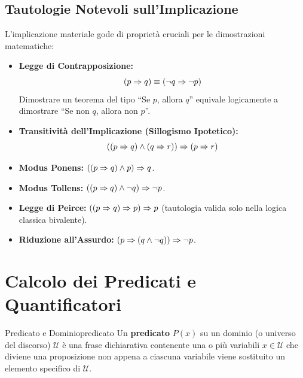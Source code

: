 \subsection{Tautologie Notevoli sull'Implicazione}
L'implicazione materiale gode di proprietà cruciali per le dimostrazioni matematiche:
\begin{itemize}
    \item \textbf{Legge di Contrapposizione:}
    \[
        (p \Rightarrow q) \equiv (\neg q \Rightarrow \neg p)
    \]
    Dimostrare un teorema del tipo ``Se $p$, allora $q$'' equivale logicamente a dimostrare ``Se non $q$, allora non $p$''.
    \item \textbf{Transitività dell'Implicazione (Sillogismo Ipotetico):}
    \[
        ((p \Rightarrow q) \wedge (q \Rightarrow r)) \Rightarrow (p \Rightarrow r)
    \]
    \item \textbf{Modus Ponens:} $((p \Rightarrow q) \wedge p) \Rightarrow q$.
    \item \textbf{Modus Tollens:} $((p \Rightarrow q) \wedge \neg q) \Rightarrow \neg p$.
    \item \textbf{Legge di Peirce:} $((p \Rightarrow q) \Rightarrow p) \Rightarrow p$ (tautologia valida solo nella logica classica bivalente).
    \item \textbf{Riduzione all'Assurdo:} $(p \Rightarrow (q \wedge \neg q)) \Rightarrow \neg p$.
\end{itemize}

\section{Calcolo dei Predicati e Quantificatori}

\begin{definizione}{Predicato e Dominio}{predicato}
Un \textbf{predicato} $P(x)$ su un dominio (o universo del discorso) $\mathcal{U}$ è una frase dichiarativa contenente una o più variabili $x \in \mathcal{U}$ che diviene una proposizione non appena a ciascuna variabile viene sostituito un elemento specifico di $\mathcal{U}$.
\end{definizione}

